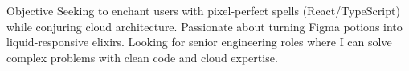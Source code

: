 \begin{rSection}{Objective}
\iffrontend
Seeking to enchant users with pixel-perfect spells (React/TypeScript) while conjuring cloud architecture. Passionate about turning Figma potions into liquid-responsive elixirs.
\else
Looking for senior engineering roles where I can solve complex problems with clean code and cloud expertise.
\fi
\end{rSection}